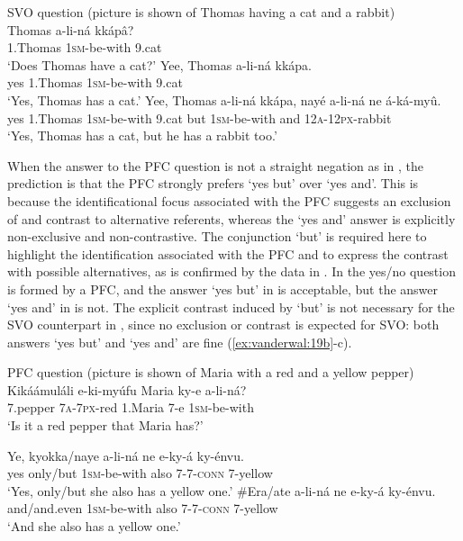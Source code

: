 \documentclass[output=paper]{langsci/langscibook}
\begin{document}
 
\ea\label{ex:vanderwal:17}SVO question
       (picture is shown of Thomas having a cat and a rabbit)\\
\ea\label{ex:vanderwal:17a}
\gll   Thomas  a-li-ná  kkápâ?\\
       1.Thomas  \textsc{1sm}-be-with  9.cat\\
\glt   ‘Does Thomas have a cat?’
\ex\label{ex:vanderwal:17b}
\gll   Yee,   Thomas  a-li-ná  kkápa.\\
       yes  1.Thomas  \textsc{1sm}-be-with  9.cat\\
\glt   ‘Yes, Thomas has a cat.’
\ex\label{ex:vanderwal:17c}
\gll     Yee,  Thomas    a-li-ná    kkápa,  nayé  a-li-ná    ne  á-ká-myû.\\
       yes  1.Thomas  \textsc{1sm}-be-with  9.cat   but    \textsc{1sm}-be-with  and  \textsc{12a}-\textsc{12px}-rabbit\\
\glt   ‘Yes, Thomas has a cat, but he has a rabbit too.’
\z
\z

When the answer to the PFC question is not a straight negation as in , the prediction is that the PFC strongly prefers ‘yes but’ over ‘yes and’. This is because the identificational focus associated with the PFC suggests an exclusion of and contrast to alternative referents, whereas the ‘yes and’ answer is explicitly non-exclusive and non-contrastive. The conjunction ‘but’ is required here to highlight the identification associated with the PFC and to express the contrast with possible alternatives, as is confirmed by the data in . In  the yes/no question is formed by a PFC, and the answer ‘yes but’ in  is acceptable, but the answer ‘yes and’ in  is not. The explicit contrast induced by ‘but’ is not necessary for the SVO counterpart in , since no exclusion or contrast is expected for SVO: both answers ‘yes but’ and ‘yes and’ are fine (\ref{ex:vanderwal:19b}-c).

\ea\label{ex:vanderwal:18}PFC question
     (picture is shown of Maria with a red and a yellow pepper)\\
\ea\label{ex:vanderwal:18a}
\gll     Kikáámuláli  e-ki-myúfu  Maria    ky-e  a-li-ná?\\
         7.pepper  \textsc{7a}-\textsc{7px}-red  1.Maria  7-e  \textsc{1sm}-be-with\\
\glt     ‘Is it a red pepper that Maria has?’

\ex\label{ex:vanderwal:18b}
\gll     Ye,  kyokka/naye  a-li-ná  ne  e-ky-á    ky-énvu.\\
         yes  only/but  \textsc{1sm}-be-with  also  \textsc{7}-\textsc{7}-\textsc{conn}  7-yellow\\
\glt     ‘Yes, only/but she also has a yellow one.’
\ex\label{ex:vanderwal:18c}
\gll   \#Era/ate  a-li-ná  ne  e-ky-á    ky-énvu.\\
          and/and.even  \textsc{1sm}-be-with  also  \textsc{7}-\textsc{7}-\textsc{conn}  7-yellow\\
\glt     ‘And she also has a yellow one.’
\z
\z
\end{document}

